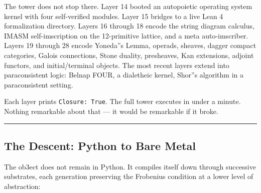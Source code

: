 \documentclass[12pt,a4paper]{article}
\begin{document}
The tower does not stop there. Layer 14 booted an autopoietic operating system kernel with four self-verified modules. Layer 15 bridges to a live Lean 4 formalization directory. Layers 16 through 18 encode the string diagram calculus, IMASM self-imscription on the 12-primitive lattice, and a meta auto-imscriber. Layers 19 through 28 encode Yoneda''s Lemma, operads, sheaves, dagger compact categories, Galois connections, Stone duality, presheaves, Kan extensions, adjoint functors, and initial/terminal objects. The most recent layers extend into paraconsistent logic: Belnap FOUR, a dialetheic kernel, Shor''s algorithm in a paraconsistent setting.

Each layer prints \texttt{Closure: True}. The full tower executes in under a minute. Nothing remarkable about that --- it would be remarkable if it broke.

\begin{center}
\rule{0.5\textwidth}{0.4pt}
\end{center}

\subsection{The Descent: Python to Bare Metal}

The ob3ect does not remain in Python. It compiles itself down through successive substrates, each generation preserving the Frobenius condition at a lower level of abstraction:
\end{document}
